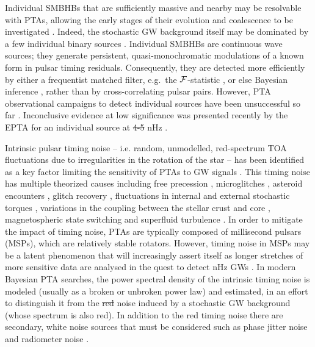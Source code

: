 \documentclass[fleqn,usenatbib,useAMS]{mnras}
\providecommand{\DIFadd}[1]{{\protect\color{blue}\uwave{#1}}} %
\providecommand{\DIFdel}[1]{{\protect\color{red}\sout{#1}}}                      %
\providecommand{\DIFaddbegin}{} %
\providecommand{\DIFaddend}{} %
\providecommand{\DIFdelbegin}{} %
\providecommand{\DIFdelend}{} %
\newcommand{\DIFscaledelfig}{0.5}
\newlength{\DIFdelgraphicswidth} %
\newlength{\DIFdelgraphicsheight} %
\newcommand{\DIFaddincludegraphics}[2][]{{\color{blue}\fbox{\DIFOincludegraphics[#1]{#2}}}} %
\newcommand{\DIFdelincludegraphics}[2][]{%
\sbox{\DIFdelgraphicsbox}{\DIFOincludegraphics[#1]{#2}}%
\settoboxwidth{\DIFdelgraphicswidth}{\DIFdelgraphicsbox} %
\settoboxtotalheight{\DIFdelgraphicsheight}{\DIFdelgraphicsbox} %
\scalebox{\DIFscaledelfig}{%
\parbox[b]{\DIFdelgraphicswidth}{\usebox{\DIFdelgraphicsbox}\\[-\baselineskip] \rule{\DIFdelgraphicswidth}{0em}}\llap{\resizebox{\DIFdelgraphicswidth}{\DIFdelgraphicsheight}{%
\setlength{\unitlength}{\DIFdelgraphicswidth}%
\begin{picture}(1,1)%
\thicklines\linethickness{2pt} %
{\color[rgb]{1,0,0}\put(0,0){\framebox(1,1){}}}%
{\color[rgb]{1,0,0}\put(0,0){\line( 1,1){1}}}%
{\color[rgb]{1,0,0}\put(0,1){\line(1,-1){1}}}%
\end{picture}%
}\hspace*{3pt}}} %
} %
\DeclareRobustCommand{\DIFaddbegin}{\DIFOaddbegin \let\includegraphics\DIFaddincludegraphics} %
\DeclareRobustCommand{\DIFaddend}{\DIFOaddend \let\includegraphics\DIFOincludegraphics} %
\DeclareRobustCommand{\DIFdelbegin}{\DIFOdelbegin \let\includegraphics\DIFdelincludegraphics} %
\DeclareRobustCommand{\DIFdelend}{\DIFOaddend \let\includegraphics\DIFOincludegraphics} %
\begin{document}
Individual SMBHBs that are sufficiently massive and nearby may be resolvable with PTAs, allowing the early stages of their evolution and coalescence to be investigated \citep{Sesana2010,Yardley2010,Zhu10,Babak2012,2013CQGra..30v4004E,Zhupulsarterms}. 
Indeed, the stochastic GW background itself may be dominated by a few individual binary sources \citep{Ravi2012singlesource}. Individual SMBHBs are continuous wave sources; they generate persistent, quasi-monochromatic modulations of a known form in pulsar timing residuals. Consequently, they are detected more efficiently by either a frequentist matched filter, e.g.\ the ${\cal F}$-statistic \citep{Lee2011MNRAS.414.3251L, Ellis2012ApJ,Zhu2014PPTA}, or else Bayesian inference \citep{Ellis2016,Arzoumanian2020A}, rather than by cross-correlating pulsar pairs. However, PTA observational campaigns to detect individual sources have been unsuccessful so far \citep{Jenet2004,Zhu2014PPTA,Babak2016,Arzoumanian2023}. Inconclusive evidence at low significance was presented recently by the EPTA for an individual source at \DIFdelbegin \DIFdel{4-5 }\DIFdelend \DIFaddbegin \DIFadd{4--5 }\DIFaddend nHz \citep{2023arXiv230616226A}. \newline 


Intrinsic pulsar timing noise -- i.e.  random, unmodelled, red-spectrum TOA fluctuations due to irregularities in the rotation of the star -- has been identified as a key factor limiting the sensitivity of PTAs to GW signals \citep{Shannon2010,Lasky2015,Caballero2016,Goncharov2021}. This timing noise has multiple theorized causes including free precession \citep{free_precession_kerr,stairs_freeprecession}, microglitches \citep{Alessandro1995,Melatos2008,Espinoza2021}, asteroid encounters \citep{Shannon_2013,Brook_2014}, glitch recovery \citep{Johnston10,Hobbs2010glitch}, fluctuations in internal and external stochastic torques \citep{Cordes1981, 2006MNRAS.370L..76U,Myers2021MNRAS.502.3113M,Meyers2021,Antonelli2023}, variations in the coupling between the stellar crust and core \citep{Jones1990MNRAS.246..364J,Meyers2021,Melatos2023}, magnetospheric state switching \citep{magneto1,Lyne2010L,Stairs2019MNRAS.485.3230S} and superfluid turbulence \citep{Greenstein1970,Peralta2006,Melatos2014}. In order to mitigate the impact of timing noise, PTAs are typically composed of millisecond pulsars (MSPs), which are relatively stable rotators. However, timing noise in MSPs may be a latent phenomenon that will increasingly assert itself as longer stretches of more sensitive data are analysed in the quest to detect nHz GWs \citep{Shannon2010}. In modern Bayesian PTA searches, the power spectral density of the \DIFaddbegin \DIFadd{red }\DIFaddend intrinsic timing noise is modeled (usually as a broken or unbroken power law) and estimated, in an effort to distinguish it from the \DIFdelbegin \DIFdel{red }\DIFdelend noise induced by a stochastic GW background (whose spectrum is also red). In addition to the red timing noise there are secondary, white noise sources that must be considered such as phase jitter noise and radiometer noise \citep{Cordes2010,Lam2019,Parthasarathy2021}. \newline 
\end{document}
